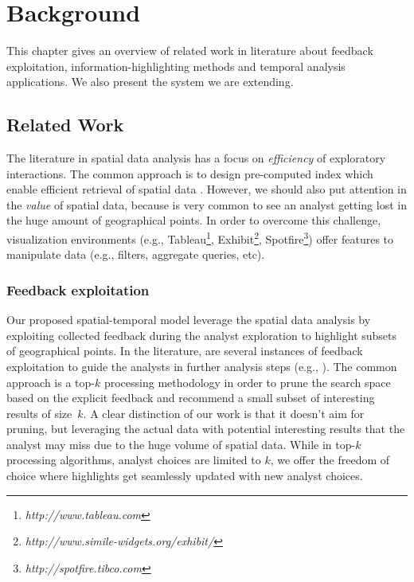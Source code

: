 \chapter{Background}
\label{chap:background}

This chapter gives an overview of related work in literature about feedback exploitation, information-highlighting methods and temporal analysis applications. We also present the system we are extending.

\section{Related Work}

The literature in spatial data analysis has a focus on {\em efficiency} of exploratory interactions. The common approach is to design pre-computed index which enable efficient retrieval of spatial data \cite{lins2013nanocubes}. However, we should also put attention in the {\em value} of spatial data, because is very common to see an analyst getting lost in the huge amount of geographical points. In order to overcome this challenge, visualization environments (e.g., Tableau\footnote{\it http://www.tableau.com}, Exhibit\footnote{\it http://www.simile-widgets.org/exhibit/}, Spotfire\footnote{\it  http://spotfire.tibco.com}) offer features to manipulate data (e.g., filters, aggregate queries, etc).

\subsection{Feedback exploitation}

Our proposed spatial-temporal model leverage the spatial data analysis by exploiting collected feedback during the analyst exploration to highlight subsets of geographical points. In the literature, are several instances of feedback exploitation to guide the analysts in further analysis steps (e.g., ).  The common approach is a top-$k$ processing methodology in order to prune the search space based on the explicit feedback and recommend a small subset of interesting results of size~$k$. A clear distinction of our work is that it doesn't aim for pruning, but leveraging the actual data with potential interesting results that the analyst may miss due to the huge volume of spatial data. While in top-$k$ processing algorithms, analyst choices are limited to $k$, we offer the freedom of choice where highlights get seamlessly updated with new analyst choices.

